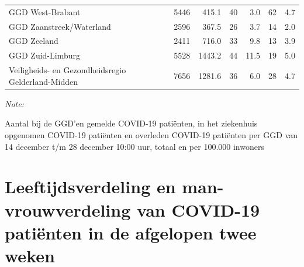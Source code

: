 \documentclass[
  english,
  man,floatsintext]{apa6}
\begin{document}
\begin{table}[H]
\begin{threeparttable}
\begin{tabular}{lrrrrrr}
GGD West-Brabant & 5446 & 415.1 & 40 & 3.0 & 62 & 4.7\\
GGD Zaanstreek/Waterland & 2596 & 367.5 & 26 & 3.7 & 14 & 2.0\\
GGD Zeeland & 2411 & 716.0 & 33 & 9.8 & 13 & 3.9\\
GGD Zuid-Limburg & 5528 & 1443.2 & 44 & 11.5 & 19 & 5.0\\
Veiligheids- en Gezondheidsregio Gelderland-Midden & 7656 & 1281.6 & 36 & 6.0 & 28 & 4.7\\
\bottomrule
\end{tabular}
\begin{tablenotes}
\item \textit{Note: } 
\item Aantal bij de GGD’en gemelde COVID-19 patiënten, in het ziekenhuis opgenomen COVID-19 patiënten en overleden COVID-19 patiënten per GGD van 14 december t/m 28 december 10:00 uur, totaal en per 100.000 inwoners
\end{tablenotes}
\end{threeparttable}
\endgroup{}
\end{table}

\newpage

\hypertarget{leeftijdsverdeling-en-man-vrouwverdeling-van-covid-19-patiuxebnten-in-de-afgelopen-twee-weken}{%
\section{Leeftijdsverdeling en man-vrouwverdeling van COVID-19 patiënten in de afgelopen twee weken}\label{leeftijdsverdeling-en-man-vrouwverdeling-van-covid-19-patiuxebnten-in-de-afgelopen-twee-weken}}
\end{document}
